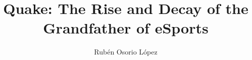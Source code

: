 \documentclass[twocolumn]{article}
\title{Quake: The Rise and Decay of the Grandfather of eSports}
\author{Rubén Osorio López}
\begin{document}
\maketitle

\begin{abstract}

\end{abstract}

%
\end{document}
